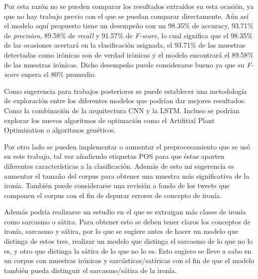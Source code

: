 \par Por esta razón no se pueden comparar los resultados extraídos en esta ocasión, ya que no hay trabajo previo con el que se puedan comparar directamente. Aún así el modelo aquí propuesto  tiene un desempeño con un 98.35\% de accuracy, 93.71\% de \textit{precision}, 89.58\% de \textit{recall} y 91.57\% de \textit{F-score}, lo cual significa que el 98.35\% de las ocasiones acertará en la clasificación asignada, el 93.71\% de las muestras detectadas como irónicas son de verdad irónicas y el modelo encontrará el 89.58\% de las muestras irónicas. Dicho desempeño puede considerarse bueno ya que su \textit{F-score} supera el 80\% promedio.

\par Como sugerencia para trabajos posteriores se puede establecer una metodología de exploración entre los diferentes modelos que podrían dar mejores resultados. Como la combinación de la arquitectura CNN y la LSTM. Incluso se podrían explorar los nuevos algoritmos de optimación como el Artifitial Plant Optimization o algoritmos genéticos.

\par Por otro lado se pueden implementar o aumentar el preprocesamiento que se usó en este trabajo, tal vez añadiendo etiquetas POS para que éstas aporten diferentes características a la clasificación. Además de esto mi sugerencia es aumentar el tamaño del corpus para obtener una muestra más significativa de la ironía. También puede considerarse una revisión a fondo de los tweets que componen el corpus con el fin de depurar errores de concepto de ironía.

\par Además podría realizarse un estudio en el que se extraigan más clases de ironía como sarcasmo o sátira. Para obtener esto se deben tener claros los conceptos de ironía, sarcasmo y sátira, por lo que se sugiere antes de hacer un modelo que distinga de estos tres, realizar un modelo que distinga el sarcasmo de lo que no lo es, y otro que distinga la sátira de lo que no lo es. Esto sugiero se lleve a cabo en un corpus con muestras irónicas y sarcásticas/satíricas con el fin de que el modelo también pueda distinguir el sarcasmo/sátira de la ironía.

